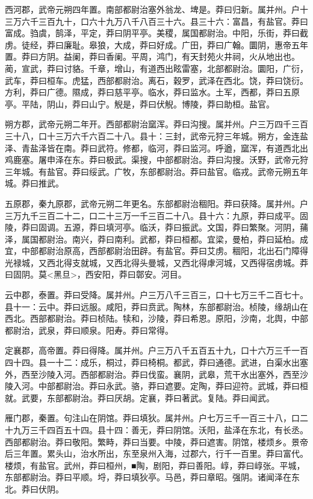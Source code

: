 \documentclass[]{article}
\begin{document}
西河郡，武帝元朔四年置。南部都尉治塞外翁龙、埤是。莽曰归新。属并州。户十三万六千三百九十，口六十九万八千八百三十六。县三十六：富昌，有盐官。莽曰富成。驺虞，鹄泽，平定，莽曰阴平亭。美稷，属国都尉治。中阳，乐街，莽曰截虏。徒经，莽曰廉耻。皋狼，大成，莽曰好成。广田，莽曰广翰。圜阴，惠帝五年置。莽曰方阴。益阑，莽曰香阑。平周，鸿门，有天封苑火井祠，火从地出也。蔺，宣武，莽曰讨貉。千章，增山，有道西出眩雷塞，北部都尉治。圜阳，广衍，武车，莽曰桓车。虎猛，西部都尉治。离石，穀罗，武泽在西北。饶，莽曰饶衍。方利，莽曰广德。隰成，莽曰慈平亭。临水，莽曰监水。土军，西都，莽曰五原亭。平陆，阴山，莽曰山宁。觬是，莽曰伏觬。博陵，莽曰助桓。盐官。

朔方郡，武帝元朔二年开。西部都尉治窳浑。莽曰沟搜。属并州。户三万四千三百三十八，口十三万六千六百二十八。县十：三封，武帝元狩三年城。朔方，金连盐泽、青盐泽皆在南。莽曰武符。修都，临河，莽曰监河。呼遒，窳浑，有道西北出鸡鹿塞。屠申泽在东。莽曰极武。渠搜，中部都尉治。莽曰沟搜。沃野，武帝元狩三年城。有盐官。莽曰绥武。广牧，东部都尉治。莽曰盐官。临戎。武帝元朔五年城。莽曰推武。

五原郡，秦九原郡，武帝元朔二年更名。东部都尉治稒阳。莽曰获降。属并州。户三万九千三百二十二，口二十三万一千三百二十八。县十六：九原，莽曰成平。固陵，莽曰固调。五源，莽曰填河亭。临沃，莽曰振武。文国，莽曰繁聚。河阴，蒱泽，属国都尉治。南兴，莽曰南利。武都，莽曰桓都。宜梁，曼柏，莽曰延柏。成宜，中部都尉治原高，西部都尉治田辟。有盐官。莽曰艾虏。稒阳，北出石门障得光禄城，又西北得支就城，又西北得头曼城，又西北得虖河城，又西得宿虏城。莽曰固阴。莫\textless{}黑旦\textgreater{}，西安阳，莽曰鄣安。河目。

云中郡，泰置。莽曰受降。属并州。户三万八千三百三，口十七万三千二百七十。县十一：云中。莽曰远服。咸阳，莽曰贲武。陶林，东部都尉治。桢陵，缘胡山在西北。西部都尉治。莽曰桢陆。犊和，沙陵，莽曰希恩。原阳，沙南，北舆，中部都尉治，武泉，莽曰顺泉。阳寿。莽曰常得。

定襄郡，高帝置。莽曰得降。属并州。户三万八千五百五十九，口十六万三千一百四十四。县一十二：成乐，桐过，莽曰椅桐。都武，莽曰通德。武进，白渠水出塞外，西至沙陵入河。西部都尉治。莽曰伐蛮。襄阴，武皋，荒干水出塞外，西至沙陵入河。中部都尉治。莽曰永武。骆，莽曰遮要。定陶，莽曰迎符。武城，莽曰桓就。武要，东部都尉治。莽曰厌胡。定襄，莽曰著武。复陆。莽曰闻武。

雁门郡，秦置。句注山在阴馆。莽曰填狄。属并州。户七万三千一百三十八，口二十九万三千四百五十四。县十四：善无，莽曰阴馆。沃阳，盐泽在东北，有长丞。西部都尉治。莽曰敬阳。繁畤，莽曰当要。中陵，莽曰遮害。阴馆，楼烦乡。景帝后三年置。累头山，治水所出，东至泉州入海，过郡六，行千一百里。莽曰富代。楼烦，有盐官。武州，莽曰桓州，■陶，剧阳，莽曰善阳。崞，莽曰崞张。平城，东部都尉治。莽曰平顺。埒，莽曰填狄亭。马邑，莽曰章昭。强阴。诸闻泽在东北。莽曰伏阴。
\end{document}
